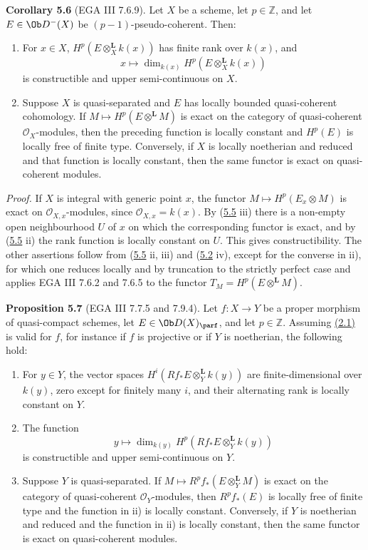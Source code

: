 \textbf{Corollary 5.6} (EGA III 7.6.9). Let \(X\) be a scheme, let \(p\in\mathbb Z\), and let \(E\in\Ob D^{-}(X)\) be \((p-1)\)-pseudo-coherent. Then:
\begin{enumerate}[label=\roman*)]
\item For \(x\in X\), \(H^p(E\otimes_X^{\mathbf L}k(x))\) has finite rank over \(k(x)\), and
\[
 x\longmapsto \dim_{k(x)}H^p(E\otimes_X^{\mathbf L}k(x))
\]
is constructible and upper semi-continuous on \(X\).
\item Suppose \(X\) is quasi-separated and \(E\) has locally bounded quasi-coherent cohomology. If \(M\mapsto H^p(E\otimes^{\mathbf L}M)\) is exact on the category of quasi-coherent \(\mathcal O_X\)-modules, then the preceding function is locally constant and \(H^p(E)\) is locally free of finite type. Conversely, if \(X\) is locally noetherian and reduced and that function is locally constant, then the same functor is exact on quasi-coherent modules.
\end{enumerate}

\emph{Proof.} If \(X\) is integral with generic point \(x\), the functor \(M\mapsto H^p(E_x\otimes M)\) is exact on \(\mathcal O_{X,x}\)-modules, since \(\mathcal O_{X,x}=k(x)\). By (\hyperlink{sga6.e03.lem.5-5}{5.5} iii) there is a non-empty open neighbourhood \(U\) of \(x\) on which the corresponding functor is exact, and by (\hyperlink{sga6.e03.lem.5-5}{5.5} ii) the rank function is locally constant on \(U\). This gives constructibility. The other assertions follow from (\hyperlink{sga6.e03.lem.5-5}{5.5} ii, iii) and (\hyperlink{sga6.e03.rem.5-2}{5.2} iv), except for the converse in ii), for which one reduces locally and by truncation to the strictly perfect case and applies EGA III 7.6.2 and 7.6.5 to the functor \(T_M=H^p(E\otimes^{\mathbf L}M)\).

\textbf{Proposition 5.7} (EGA III 7.7.5 and 7.9.4). Let \(f:X\to Y\) be a proper morphism of quasi-compact schemes, let \(E\in\Ob D(X)_{\parf}\), and let \(p\in\mathbb Z\). Assuming \hyperlink{sga6.e03.conj.2-1}{(2.1)} is valid for \(f\), for instance if \(f\) is projective or if \(Y\) is noetherian, the following hold:
\begin{enumerate}[label=\roman*)]
\item For \(y\in Y\), the vector spaces \(H^i(Rf_*E\otimes_Y^{\mathbf L}k(y))\) are finite-dimensional over \(k(y)\), zero except for finitely many \(i\), and their alternating rank is locally constant on \(Y\).
\item The function
\[
 y\longmapsto \dim_{k(y)}H^p(Rf_*E\otimes_Y^{\mathbf L}k(y))
\]
is constructible and upper semi-continuous on \(Y\).
\item Suppose \(Y\) is quasi-separated. If \(M\mapsto R^pf_*(E\otimes_Y^{\mathbf L}M)\) is exact on the category of quasi-coherent \(\mathcal O_Y\)-modules, then \(R^pf_*(E)\) is locally free of finite type and the function in ii) is locally constant. Conversely, if \(Y\) is noetherian and reduced and the function in ii) is locally constant, then the same functor is exact on quasi-coherent modules.
\end{enumerate}

